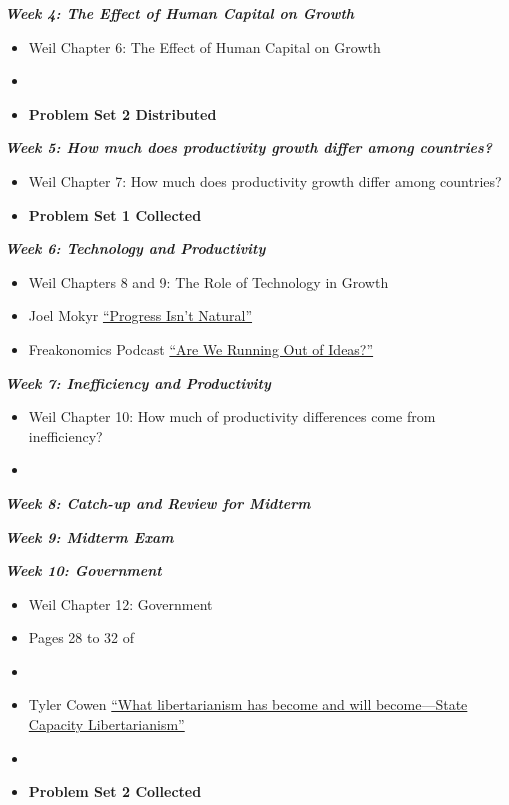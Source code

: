 \documentclass[11pt]{article}
\begin{document}
\noindent \textbf{\textit{Week 4: The Effect of Human Capital on Growth}}
\begin{itemize}
\item Weil Chapter 6: The Effect of Human Capital on Growth
\smallskip
\item {}
\smallskip
\item \textbf{Problem Set 2 Distributed}
\end{itemize}
\bigskip

\noindent \textbf{\textit{Week 5: How much does productivity growth differ among countries?}}
\begin{itemize}
\item Weil Chapter 7: How much does productivity growth differ among countries?
\smallskip
\item \textbf{Problem Set 1 Collected}
\end{itemize}
\bigskip

\noindent \textbf{\textit{Week 6: Technology and Productivity}}
\begin{itemize}
\item Weil Chapters 8 and 9: The Role of Technology in Growth
\smallskip
\item Joel Mokyr \href{https://www.theatlantic.com/business/archive/2016/11/progress-isnt-natural-mokyr/507740/}{``Progress Isn't Natural''}
\smallskip
\item Freakonomics Podcast \href{http://freakonomics.com/podcast/no-new-ideas/}{``Are We Running Out of Ideas?''}
\end{itemize}
\bigskip

\noindent \textbf{\textit{Week 7: Inefficiency and Productivity}}
\begin{itemize}
\item Weil Chapter 10: How much of productivity differences come from inefficiency?
\smallskip
\item {}
\end{itemize}
\bigskip

\noindent \textbf{\textit{Week 8: Catch-up and Review for Midterm}}

\noindent \textbf{\textit{Week 9: Midterm Exam}}

\noindent \textbf{\textit{Week 10: Government}}
\begin{itemize}
\item Weil Chapter 12: Government
\smallskip
\item Pages 28 to 32 of 
\smallskip
\item {}
\smallskip
\item Tyler Cowen \href{https://marginalrevolution.com/marginalrevolution/2020/01/what-libertarianism-has-become-and-will-become-state-capacity-libertarianism.html}{``What libertarianism has become and will become---State Capacity Libertarianism''}
\smallskip 
\item {}
\smallskip
\item \textbf{Problem Set 2 Collected}
\end{itemize}
\bigskip
\end{document}
